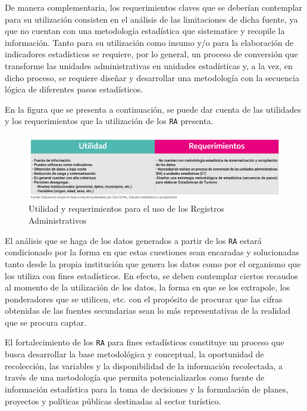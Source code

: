 \documentclass[
]{book}
\begin{document}
De manera complementaria, los requerimientos claves que se deberían contemplar para su utilización consisten en el análisis de las limitaciones de dicha fuente, ya que no cuentan con una metodología estadística que sistematice y recopile la información. Tanto para su utilización como insumo y/o para la elaboración de indicadores estadísticos se requiere, por lo general, un proceso de conversión que transforme las unidades administrativas en unidades estadísticas y, a la vez, en dicho proceso, se requiere diseñar y desarrollar una metodología con la secuencia lógica de diferentes pasos estadísticos.

En la figura que se presenta a continuación, se puede dar cuenta de las utilidades y los requerimientos que la utilización de los \texttt{RA} presenta.

\begin{figure}

{\centering \includegraphics[width=1\linewidth]{imagenes/figura01} 

}

\caption{Utilidad y requerimientos para el uso de los Registros Administrativos}\label{fig:registrosadministrativos}
\end{figure}

El análisis que se haga de los datos generados a partir de los \texttt{RA} estará condicionado por la forma en que estas cuestiones sean encaradas y solucionadas tanto desde la propia institución que genera los datos como por el organismo que los utiliza con fines estadísticos. En efecto, se deben contemplar ciertos recaudos al momento de la utilización de los datos, la forma en que se los extrapole, los ponderadores que se utilicen, etc. con el propósito de procurar que las cifras obtenidas de las fuentes secundarias sean lo más representativas de la realidad que se procura captar.

El fortalecimiento de los \texttt{RA} para fines estadísticos constituye un proceso que busca desarrollar la base metodológica y conceptual, la oportunidad de recolección, las variables y la disponibilidad de la información recolectada, a través de una metodología que permita potencializarlos como fuente de información estadística para la toma de decisiones y la formulación de planes, proyectos y políticas públicas destinadas al sector turístico.
\end{document}
